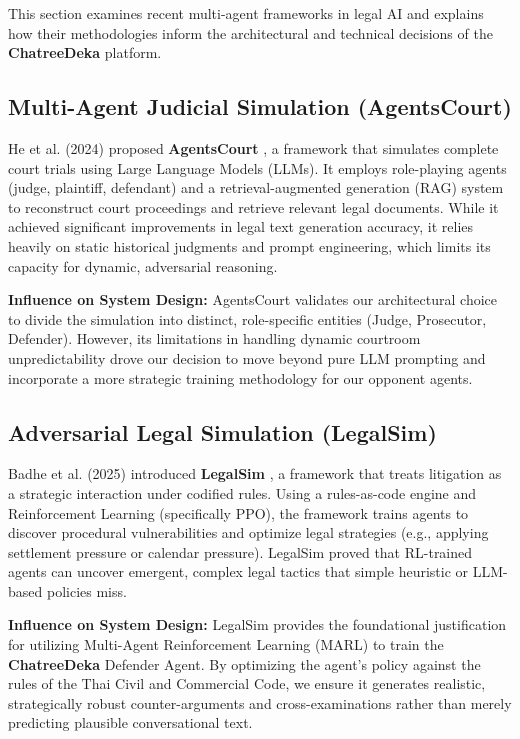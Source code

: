 This section examines recent multi-agent frameworks in legal AI and explains how their methodologies inform the architectural and technical decisions of the \textbf{ChatreeDeka} platform.

\subsection{Multi-Agent Judicial Simulation (AgentsCourt)}
He et al. (2024) proposed \textbf{AgentsCourt} \cite{arxiv_2403_02959}, a framework that simulates complete court trials using Large Language Models (LLMs). It employs role-playing agents (judge, plaintiff, defendant) and a retrieval-augmented generation (RAG) system to reconstruct court proceedings and retrieve relevant legal documents. While it achieved significant improvements in legal text generation accuracy, it relies heavily on static historical judgments and prompt engineering, which limits its capacity for dynamic, adversarial reasoning.

\textbf{Influence on System Design:} AgentsCourt validates our architectural choice to divide the simulation into distinct, role-specific entities (Judge, Prosecutor, Defender). However, its limitations in handling dynamic courtroom unpredictability drove our decision to move beyond pure LLM prompting and incorporate a more strategic training methodology for our opponent agents.

\subsection{Adversarial Legal Simulation (LegalSim)}
Badhe et al. (2025) introduced \textbf{LegalSim} \cite{arxiv_2510_03405}, a framework that treats litigation as a strategic interaction under codified rules. Using a rules-as-code engine and Reinforcement Learning (specifically PPO), the framework trains agents to discover procedural vulnerabilities and optimize legal strategies (e.g., applying settlement pressure or calendar pressure). LegalSim proved that RL-trained agents can uncover emergent, complex legal tactics that simple heuristic or LLM-based policies miss.

\textbf{Influence on System Design:} LegalSim provides the foundational justification for utilizing Multi-Agent Reinforcement Learning (MARL) to train the \textbf{ChatreeDeka} Defender Agent. By optimizing the agent's policy against the rules of the Thai Civil and Commercial Code, we ensure it generates realistic, strategically robust counter-arguments and cross-examinations rather than merely predicting plausible conversational text.

